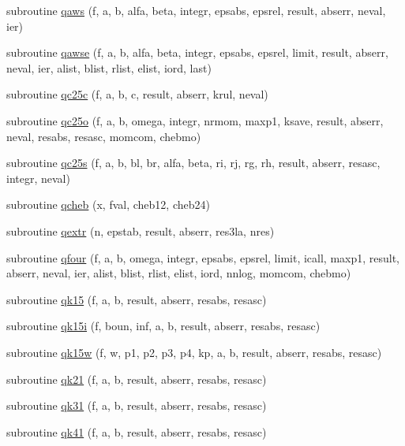\begin{DoxyCompactItemize}
\item 
subroutine \hyperlink{quadpack_8f90_a22846cb66e25f85c2eaa2b7fc1d6c81b}{qaws} (f, a, b, alfa, beta, integr, epsabs, epsrel, result, abserr, neval, ier)
\item 
subroutine \hyperlink{quadpack_8f90_adf40beeb87b948ed57824e42c023f518}{qawse} (f, a, b, alfa, beta, integr, epsabs, epsrel, limit, result, abserr, neval, ier, alist, blist, rlist, elist, iord, last)
\item 
subroutine \hyperlink{quadpack_8f90_af8148c1623b7cf59159c491cfb1856f4}{qc25c} (f, a, b, c, result, abserr, krul, neval)
\item 
subroutine \hyperlink{quadpack_8f90_ab0843f4831942d2c9bf3430cb71aca06}{qc25o} (f, a, b, omega, integr, nrmom, maxp1, ksave, result, abserr, neval, resabs, resasc, momcom, chebmo)
\item 
subroutine \hyperlink{quadpack_8f90_a034546450320f53f05096bc12af9b5bc}{qc25s} (f, a, b, bl, br, alfa, beta, ri, rj, rg, rh, result, abserr, resasc, integr, neval)
\item 
subroutine \hyperlink{quadpack_8f90_ad5beefcfdb335ea68ccf8397536c8c36}{qcheb} (x, fval, cheb12, cheb24)
\item 
subroutine \hyperlink{quadpack_8f90_a5a75101d080f224c63adde98a0e64386}{qextr} (n, epstab, result, abserr, res3la, nres)
\item 
subroutine \hyperlink{quadpack_8f90_abbba06307e0e8c4daa2651945570ba1c}{qfour} (f, a, b, omega, integr, epsabs, epsrel, limit, icall, maxp1, result, abserr, neval, ier, alist, blist, rlist, elist, iord, nnlog, momcom, chebmo)
\item 
subroutine \hyperlink{quadpack_8f90_a1722ad5ba07cec52d38c9ebf9df80a2d}{qk15} (f, a, b, result, abserr, resabs, resasc)
\item 
subroutine \hyperlink{quadpack_8f90_a59164415fc33f2f3bf4ebc4ee2220f7e}{qk15i} (f, boun, inf, a, b, result, abserr, resabs, resasc)
\item 
subroutine \hyperlink{quadpack_8f90_a0c083838940925726abd5bc85fa29587}{qk15w} (f, w, p1, p2, p3, p4, kp, a, b, result, abserr, resabs, resasc)
\item 
subroutine \hyperlink{quadpack_8f90_a27241a527b249e9de59a5ed6bee5f805}{qk21} (f, a, b, result, abserr, resabs, resasc)
\item 
subroutine \hyperlink{quadpack_8f90_aded2e8dd2218fbd159b78c0e8975a4cd}{qk31} (f, a, b, result, abserr, resabs, resasc)
\item 
subroutine \hyperlink{quadpack_8f90_aface4edf24710a0b323f5aaeb6bdec34}{qk41} (f, a, b, result, abserr, resabs, resasc)

\end{DoxyCompactItemize}
